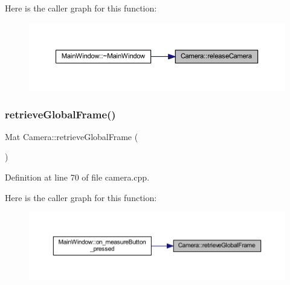 Here is the caller graph for this function\+:
\nopagebreak
\begin{figure}[H]
\begin{center}
\leavevmode
\includegraphics[width=350pt]{class_camera_a08ea14c11fdb3be4a43d84db0bd1f9e5_icgraph}
\end{center}
\end{figure}
\mbox{\label{class_camera_a588c762e434d64ad0b515576436603cf}} 
\subsubsection{\texorpdfstring{retrieveGlobalFrame()}{retrieveGlobalFrame()}}
{\footnotesize\ttfamily Mat Camera\+::retrieve\+Global\+Frame (\begin{DoxyParamCaption}{ }\end{DoxyParamCaption})}



Definition at line 70 of file camera.\+cpp.

Here is the caller graph for this function\+:
\nopagebreak
\begin{figure}[H]
\begin{center}
\leavevmode
\includegraphics[width=350pt]{class_camera_a588c762e434d64ad0b515576436603cf_icgraph}
\end{center}
\end{figure}
\mbox{\label{class_camera_a9b9c3210f57f3646f19e31904d5a0544}} 
